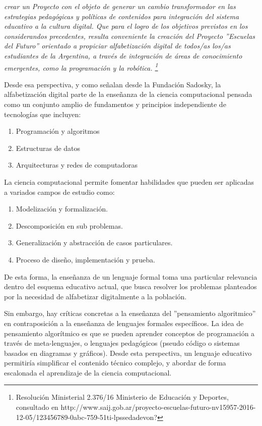 \begin{center}
\textit{
crear un Proyecto con el objeto de generar un cambio transformador en las estrategias pedagógicas y políticas de contenidos para integración del sistema educativo a la cultura digital.
Que para el logro de los objetivos previstos en los considerandos precedentes, resulta conveniente la creación del Proyecto ''Escuelas del Futuro'' orientado a propiciar alfabetización digital de todos/as los/as estudiantes de la Argentina, a través de integración de áreas de conocimiento emergentes, como la programación y la robótica. \footnote{Resolución Ministerial 2.376/16 Ministerio de Educación y Deportes, consultado en http://www.saij.gob.ar/proyecto-escuelas-futuro-nv15957-2016-12-05/123456789-0abc-759-51ti-lpssedadevon?}
} 
\end{center}

Desde esa perspectiva, y como señalan desde la Fundación Sadosky, la alfabetización digital parte de la enseñanza de la ciencia computacional  pensada como un conjunto amplio de fundamentos y principios independiente de tecnologías  \citep[pág 12]{sadosky2013cc} que incluyen:

\begin{enumerate}
  \item Programación y algoritmos
  \item Estructuras de datos
  \item Arquitecturas y redes de computadoras
\end{enumerate}

La ciencia computacional permite fomentar habilidades que pueden ser aplicadas a variados campos de estudio como:

\begin{enumerate}
  \item Modelización y formalización.
  \item Descomposición en sub problemas.
  \item Generalización y abstracción de casos particulares.
  \item Proceso de diseño, implementación y prueba.
\end{enumerate}

De esta forma, la enseñanza de un lenguaje formal toma una particular relevancia dentro del esquema educativo actual, que busca resolver los problemas planteados por la necesidad de alfabetizar digitalmente a la población.

Sin embargo, hay críticas concretas a la enseñanza del ''pensamiento algoritmico'' en contraposición a la enseñanza de lenguajes formales específicos. La idea de pensamiento algorítmico es que se pueden aprender conceptos de programación a través de meta-lenguajes, o lenguajes pedagógicos (pseudo código o sistemas basados en diagramas y gráficos). Desde esta perspectiva, un lenguaje educativo permitiría simplificar el contenido técnico complejo, y abordar de forma escalonada el aprendizaje de la ciencia computacional.

